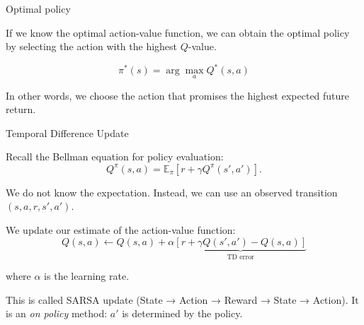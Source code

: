 \documentclass{beamer}
\begin{document}
\begin{frame}{Optimal policy}
	\begin{flushleft}
	
	If we know the optimal action-value function,
	we can obtain the optimal policy by selecting
	the action with the highest $Q$-value.
	
	\[
	\boxed{
		\pi^*(s)=\arg\max_a Q^*(s,a)
	}
	\]
	
	\vspace{0.4cm}
	
	In other words, we choose the action that promises the highest
			expected future return.

	
	\end{flushleft}
\end{frame}



\begin{frame}{Temporal Difference Update}
	\begin{flushleft}
	
	Recall the Bellman equation for policy evaluation:
	\[
	Q^\pi(s,a)=
	\mathbb{E}_\pi\left[
	r+\gamma Q^\pi(s',a')
	\right].
	\]
	
	\vspace{0.2cm}
	
	We do not know the expectation. Instead, we can use
	an observed transition $(s,a,r,s',a')$.
	
	\vspace{0.2cm}
	
	We update our estimate of the action-value function:
	\[
	\boxed{
		Q(s,a)\leftarrow Q(s,a)+\alpha
		\underbrace{
			\left[
			r+\gamma Q(s',a')-Q(s,a)
			\right]
		}_{\text{TD error}}
	}
	\]
	
	where $\alpha$ is the learning rate.
	
	\medskip
	
	This is called SARSA update (State → Action → Reward → State → Action). It is an \emph{on policy} method: $a'$ is determined by the policy.
	
	\end{flushleft}
\end{frame}
\end{document}
